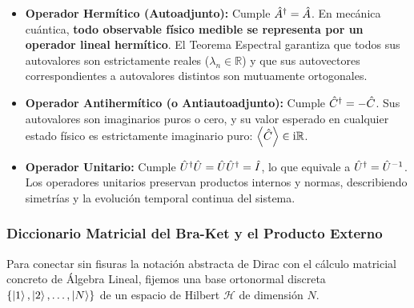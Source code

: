 \begin{teoremabox}
    \begin{itemize}
        \item \textbf{Operador Hermítico (Autoadjunto):} Cumple $\hat{A}^\dagger = \hat{A}$.
        En mecánica cuántica, \textbf{todo observable físico medible se representa por un operador lineal hermítico}. El Teorema Espectral garantiza que todos sus autovalores son estrictamente reales ($\lambda_n \in \mathbb{R}$) y que sus autovectores correspondientes a autovalores distintos son mutuamente ortogonales.
        \item \textbf{Operador Antihermítico (o Antiautoadjunto):} Cumple $\hat{C}^\dagger = -\hat{C}$.
        Sus autovalores son imaginarios puros o cero, y su valor esperado en cualquier estado físico es estrictamente imaginario puro: $\left\langle \hat{C} \right\rangle \in \mathrm{i}\mathbb{R}$.
        \item \textbf{Operador Unitario:} Cumple $\hat{U}^\dagger\hat{U} = \hat{U}\hat{U}^\dagger = \hat{I}$, lo que equivale a $\hat{U}^\dagger = \hat{U}^{-1}$. Los operadores unitarios preservan productos internos y normas, describiendo simetrías y la evolución temporal continua del sistema.
    \end{itemize}
\end{teoremabox}

\subsubsection{Diccionario Matricial del Bra-Ket y el Producto Externo}
\label{subsec:diccionario_matricial_braket}

Para conectar sin fisuras la notación abstracta de Dirac con el cálculo matricial concreto de Álgebra Lineal, fijemos una base ortonormal discreta $\{\left| 1 \right\rangle, \left| 2 \right\rangle, \dots, \left| N \right\rangle\}$ de un espacio de Hilbert $\mathcal{H}$ de dimensión $N$.

